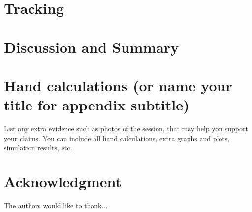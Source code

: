 \documentclass[journal]{IEEEtran}
\begin{document}






\section{Tracking}


\section{Discussion and Summary}





\appendices
\section{Hand calculations (or name your title for appendix subtitle)}
List any extra evidence such as photos of the session, that may help you support your claims.
You can include all hand calculations, extra graphs and plots, simulation results, etc. 

\section*{Acknowledgment}
The authors would like to thank...
\end{document}
